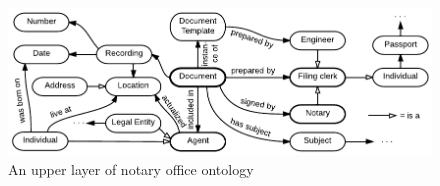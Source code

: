 \documentclass[conference]{IEEEtran}
\begin{document}
%
%
\begin{figure}[!t]
\centering
\includegraphics[width=\linewidth]{DocumentOntology-en.pdf}
\caption{An upper layer of notary office ontology}
\label{notaryontology}
\end{figure}



%
%
\end{document}
